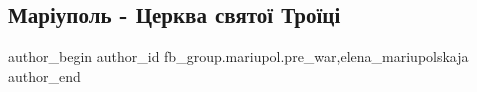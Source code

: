  
 
 
 
 

\subsection{Маріуполь - Церква святої Троїці}
\label{sec:31_01_2023.fb.fb_group.mariupol.pre_war.1.mar_upol___tserkva_s}
 
\ifcmt
 author_begin
   author_id fb_group.mariupol.pre_war,elena_mariupolskaja
 author_end
\fi
